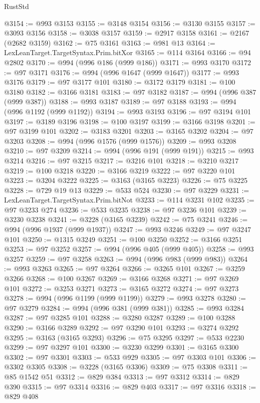 \begin{lexlean}{RustStd}
\begin{coremodule}
@3154 := @993 @3153
@3155 := @3148 @3154
@3156 := @3130 @3155
@3157 := @3093 @3156
@3158 := @3038 @3157
@3159 := @2917 @3158
@3161 := @2167 (@2682 @3159)
@3162 := @75 @3161
@3163 := @981 @13
@3164 := LexLeanTarget.TargetSyntax.Prim.bitXor
@3165 := @114 @3164
@3166 := @94 @2802
@3170 := @994 (@996 @186 (@999 @186))
@3171 := @993 @3170
@3172 := @97 @3171
@3176 := @994 (@996 @1647 (@999 @1647))
@3177 := @993 @3176
@3179 := @97 @3177 @101
@3180 := @3172 @3179
@3181 := @100 @3180
@3182 := @3166 @3181
@3183 := @97 @3182
@3187 := @994 (@996 @387 (@999 @387))
@3188 := @993 @3187
@3189 := @97 @3188
@3193 := @994 (@996 @1192 (@999 @1192))
@3194 := @993 @3193
@3196 := @97 @3194 @101
@3197 := @3189 @3196
@3198 := @100 @3197
@3199 := @3166 @3198
@3201 := @97 @3199 @101
@3202 := @3183 @3201
@3203 := @3165 @3202
@3204 := @97 @3203
@3208 := @994 (@996 @1576 (@999 @1576))
@3209 := @993 @3208
@3210 := @97 @3209
@3214 := @994 (@996 @191 (@999 @191))
@3215 := @993 @3214
@3216 := @97 @3215
@3217 := @3216 @101
@3218 := @3210 @3217
@3219 := @100 @3218
@3220 := @3166 @3219
@3222 := @97 @3220 @101
@3223 := @3204 @3222
@3225 := @3163 (@3165 @3223)
@3226 := @75 @3225
@3228 := @729 @19 @13
@3229 := @533 @524
@3230 := @97 @3229
@3231 := LexLeanTarget.TargetSyntax.Prim.bitNot
@3233 := @114 @3231 @102
@3235 := @97 @3233 @274
@3236 := @533 @3235
@3238 := @97 @3236 @101
@3239 := @3230 @3238
@3241 := @3228 (@3165 @3239)
@3242 := @75 @3241
@3246 := @994 (@996 @1937 (@999 @1937))
@3247 := @993 @3246
@3249 := @97 @3247 @101
@3250 := @1315 @3249
@3251 := @100 @3250
@3252 := @3166 @3251
@3253 := @97 @3252
@3257 := @994 (@996 @405 (@999 @405))
@3258 := @993 @3257
@3259 := @97 @3258
@3263 := @994 (@996 @983 (@999 @983))
@3264 := @993 @3263
@3265 := @97 @3264
@3266 := @3265 @101
@3267 := @3259 @3266
@3268 := @100 @3267
@3269 := @3166 @3268
@3271 := @97 @3269 @101
@3272 := @3253 @3271
@3273 := @3165 @3272
@3274 := @97 @3273
@3278 := @994 (@996 @1199 (@999 @1199))
@3279 := @993 @3278
@3280 := @97 @3279
@3284 := @994 (@996 @381 (@999 @381))
@3285 := @993 @3284
@3287 := @97 @3285 @101
@3288 := @3280 @3287
@3289 := @100 @3288
@3290 := @3166 @3289
@3292 := @97 @3290 @101
@3293 := @3274 @3292
@3295 := @3163 (@3165 @3293)
@3296 := @75 @3295
@3297 := @533 @2230
@3299 := @97 @3297 @101
@3300 := @3230 @3299
@3301 := @3165 @3300
@3302 := @97 @3301
@3303 := @533 @929
@3305 := @97 @3303 @101
@3306 := @3302 @3305
@3308 := @3228 (@3165 @3306)
@3309 := @75 @3308
@3311 := @85 @1542 @51
@3312 := @829 @384
@3313 := @97 @3312
@3314 := @829 @390
@3315 := @97 @3314
@3316 := @829 @403
@3317 := @97 @3316
@3318 := @829 @408

\end{coremodule}
\end{lexlean}
